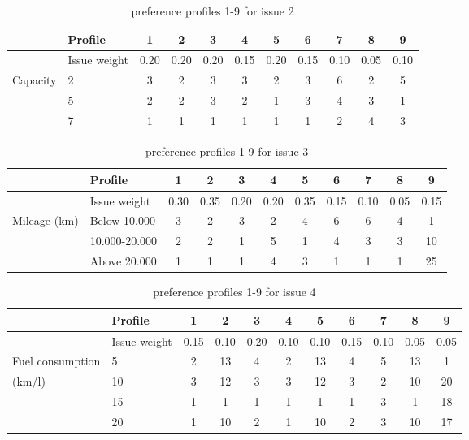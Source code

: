 \documentclass[11pt,a4paper]{report}
\begin{document}
\begin{table}[H]
\centering
\caption{preference profiles 1-9 for issue 2}
\label{tab:issue2}
\begin{tabular}{|p{3cm}|p{3cm}||c|c|c|c|c|c|c|c|c|}
\hline
&Profile & 1 & 2 & 3 & 4 & 5 & 6 & 7 & 8 & 9 \\
\hline
&Issue weight& 0.20 & 0.20 & 0.20 & 0.15 & 0.20 & 0.15 & 0.10 & 0.05 & 0.10 \\
\hline
\hline
Capacity & 2 & 3 & 2 &3 &3 &2 &3 &6 &2 &5 \\
&5           & 2 & 2 &3 &2 &1 &3 &4 &3 &1 \\
&7           & 1 & 1 &1 &1 &1 &1 &2 &4 &3 \\
\hline
\end{tabular}
\end{table}



\begin{table}[H]
\centering
\caption{preference profiles 1-9 for issue 3}
\label{tab:issue3}
\begin{tabular}{|p{3cm}|p{3cm}||c|c|c|c|c|c|c|c|c|}
\hline
&Profile & 1 & 2 & 3 & 4 & 5 & 6 & 7 & 8 & 9 \\
\hline
&Issue weight& 0.30 & 0.35 & 0.20 & 0.20 & 0.35 & 0.15 & 0.10 & 0.05 & 0.15 \\
\hline
\hline
Mileage (km)
&Below 10.000    & 3 & 2 &3 &2 &4 &6 &6 &4 &1 \\
&10.000-20.000   & 2 & 2 &1 &5 &1 &4 &3 &3 &10 \\
&Above 20.000    & 1 & 1 &1 &4 &3 &1 &1 &1 &25 \\
\hline
\end{tabular}
\end{table}



\begin{table}[H]
\centering
\caption{preference profiles 1-9 for issue 4}
\label{tab:issue4}
\begin{tabular}{|p{3cm}|p{3cm}||c|c|c|c|c|c|c|c|c|}
\hline
&Profile & 1 & 2 & 3 & 4 & 5 & 6 & 7 & 8 & 9 \\
\hline
&Issue weight& 0.15 & 0.10 & 0.20 & 0.10 & 0.10 & 0.15 & 0.10 & 0.05 & 0.05 \\
\hline
\hline
Fuel consumption &5   & 2 & 13 &4 &2 &13 &4 &5 &13 &1  \\
(km/l)           &10  & 3 & 12 &3 &3 &12 &3 &2 &10 &20 \\
                 &15  & 1 & 1  &1 &1 &1  &1 &3 &1  &18 \\
                 &20  & 1 & 10 &2 &1 &10 &2 &3 &10 &17 \\
\hline
\end{tabular}
\end{table}
\end{document}
